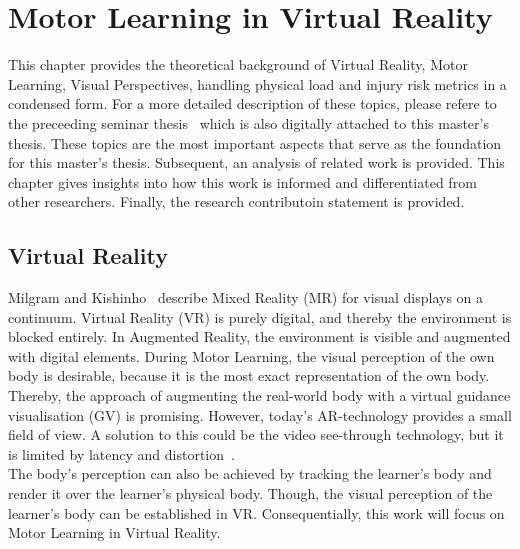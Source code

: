 \chapter{Motor Learning in Virtual Reality}
\label{chapter:theoretical_background}
This chapter provides the theoretical background of Virtual Reality, Motor Learning, Visual Perspectives, handling physical load and injury risk metrics in a condensed form. For a more detailed description of these topics, please refere to the preceeding seminar thesis~\cite{seminarThesis} which is also digitally attached to this master's thesis. These topics are the most important aspects that serve as the foundation for this master's thesis. Subsequent, an analysis of related work is provided. This chapter gives insights into how this work is informed and differentiated from other researchers. Finally, the research contributoin statement is provided.

\section{Virtual Reality}
\label{section:mixed_reality}
Milgram and Kishinho~\cite{mrcontinuum} describe Mixed Reality (MR) for visual displays on a continuum. Virtual Reality (VR) is purely digital, and thereby the environment is blocked entirely. In Augmented Reality, the environment is visible and augmented with digital elements. During Motor Learning, the visual perception of the own body is desirable, because it is the most exact representation of the own body. Thereby, the approach of augmenting the real-world body with a virtual guidance visualisation (GV) is promising. However, today's AR-technology provides a small field of view. A solution to this could be the video see-through technology, but it is limited by latency and distortion~\cite{max}.\\
The body's perception can also be achieved by tracking the learner's body and render it over the learner's physical body. Though, the visual perception of the learner's body can be established in VR. Consequentially, this work will focus on Motor Learning in Virtual Reality.

